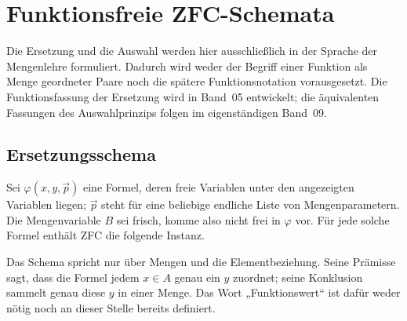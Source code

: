 \documentclass[main.tex]{subfiles}
\begin{document}
\chapter{Funktionsfreie ZFC-Schemata}

Die Ersetzung und die Auswahl werden hier ausschließlich in der Sprache der
Mengenlehre formuliert. Dadurch wird weder der Begriff einer Funktion als
Menge geordneter Paare noch die spätere Funktionsnotation vorausgesetzt. Die
Funktionsfassung der Ersetzung wird in Band~05 entwickelt; die äquivalenten
Fassungen des Auswahlprinzips folgen im eigenständigen Band~09.

\section{Ersetzungsschema}

Sei \(\varphi(x,y,\vec p)\) eine Formel, deren freie Variablen unter den
angezeigten Variablen liegen; \(\vec p\) steht für eine beliebige endliche
Liste von Mengenparametern. Die Mengenvariable \(B\) sei frisch, komme also
nicht frei in \(\varphi\) vor. Für jede solche Formel enthält ZFC die folgende
Instanz.


Das Schema spricht nur über Mengen und die Elementbeziehung. Seine Prämisse
sagt, dass die Formel jedem \(x\in A\) genau ein \(y\) zuordnet; seine
Konklusion sammelt genau diese \(y\) in einer Menge. Das Wort
„Funktionswert“ ist dafür weder nötig noch an dieser Stelle bereits
definiert.
\end{document}
